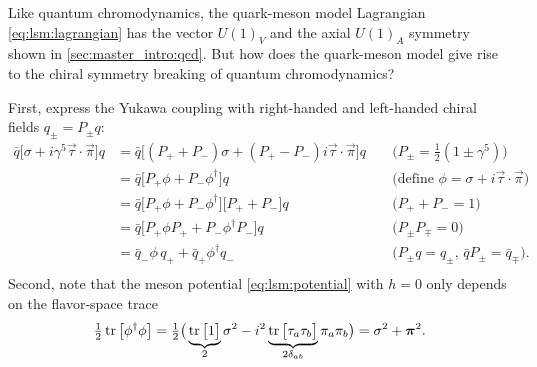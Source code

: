 \pagebreak
Like quantum chromodynamics, the quark-meson model Lagrangian \eqref{eq:lsm:lagrangian} has the vector $U(1)_V$ and the axial $U(1)_A$ symmetry shown in \cref{sec:master_intro:qcd}.
But how does the quark-meson model give rise to the chiral symmetry breaking of quantum chromodynamics?

First, express the Yukawa coupling with right-handed and left-handed chiral fields $q_\pm = P_\pm q$:
\begin{equation}
\begin{aligned}
	\bar{q} \big[\sigma + i \gamma^5 \vec{\tau} \cdot \vec{\pi}\big] q &= \bar{q} \big[ (P_+ + P_-) \sigma + (P_+ - P_-) i \vec{\tau} \cdot \vec{\pi}\big] q && \; \big( P_\pm = \tfrac{1}{2} (1 \pm \gamma^5) \big) \\
	                                                           &= \bar{q} \big[ P_+ \phi + P_- \phi^\dagger\big] q && \; \big( \text{define } \phi=\sigma+i\vec{\tau}\cdot\vec{\pi} \big) \\
	                                                           &= \bar{q} \big[ P_+ \phi + P_- \phi^\dagger\big] \big[ P_+ + P_- \big] q && \; \big( P_+ + P_- = 1 \big) \\
	                                                           &= \bar{q} \big[ P_+ \phi P_+ + P_- \phi^\dagger P_-\big] q && \; \big( \text{$P_\pm P_\mp = 0$} \big)\\
	                                                           &= \bar{q}_- \phi \, q_+ + \bar{q}_+ \phi^\dagger q_- && \; \big( \text{$P_\pm q = q_\pm$, $\bar{q} P_\pm = \bar{q}_\mp$} \big).\\
\end{aligned}
\label{eq:lsm:yukawa_symmetry}
\end{equation}
Second, note that the meson potential \eqref{eq:lsm:potential} with $h=0$ only depends on the flavor-space trace
\begin{equation}
	\tfrac12 \operatorname{tr}\big[\phi^\dagger \phi\big] = \tfrac12 \big( \underbrace{\operatorname{tr}\big[1\big]}_2 \sigma^2 - i^2 \underbrace{\operatorname{tr}\big[\tau_a \tau_b \big]}_{2 \delta_{ab}} \pi_a \pi_b \big) = \sigma^2 + {\bm{\pi}}^2.
\label{eq:lsm:meson_symmetry}
\end{equation}
